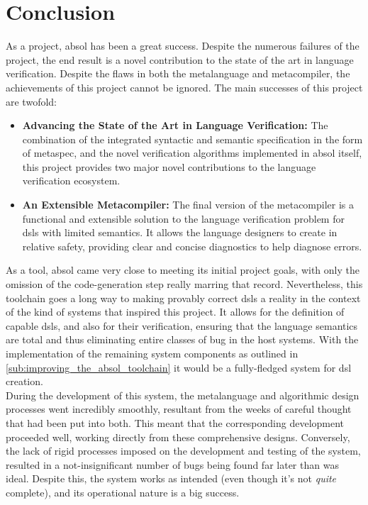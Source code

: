 \chapter{Conclusion} %
\label{cha:conclusion}
As a project, \gls{absol} has been a great success.
Despite the numerous failures of the project, the end result is a novel contribution to the state of the art in language verification. 
Despite the flaws in both the metalanguage and metacompiler, the achievements of this project cannot be ignored. 
The main successes of this project are twofold:
\begin{itemize}
    \item \textbf{Advancing the State of the Art in Language Verification:} The combination of the integrated syntactic and semantic specification in the form of \gls{metaspec}, and the novel verification algorithms implemented in \gls{absol} itself, this project provides two major novel contributions to the language verification ecosystem.
    \item \textbf{An Extensible Metacompiler:} The final version of the metacompiler is a functional and extensible solution to the language verification problem for \glspl{dsl} with limited semantics.
    It allows the language designers to create in relative safety, providing clear and concise diagnostics to help diagnose errors.
\end{itemize}

As a tool, \gls{absol} came very close to meeting its initial project goals, with only the omission of the code-generation step really marring that record. 
Nevertheless, this toolchain goes a long way to making provably correct \glspl{dsl} a reality in the context of the kind of systems that inspired this project.
It allows for the definition of capable \glspl{dsl}, and also for their verification, ensuring that the language semantics are total and thus eliminating entire classes of bug in the host systems.
With the implementation of the remaining system components as outlined in \autoref{sub:improving_the_absol_toolchain} it would be a fully-fledged system for \gls{dsl} creation.\\

During the development of this system, the metalanguage and algorithmic design processes went incredibly smoothly, resultant from the weeks of careful thought that had been put into both. 
This meant that the corresponding development proceeded well, working directly from these comprehensive designs.
Conversely, the lack of rigid processes imposed on the development and testing of the system, resulted in a not-insignificant number of bugs being found far later than was ideal.
Despite this, the system works as intended (even though it's not \textit{quite} complete), and its operational nature is a big success. \\

